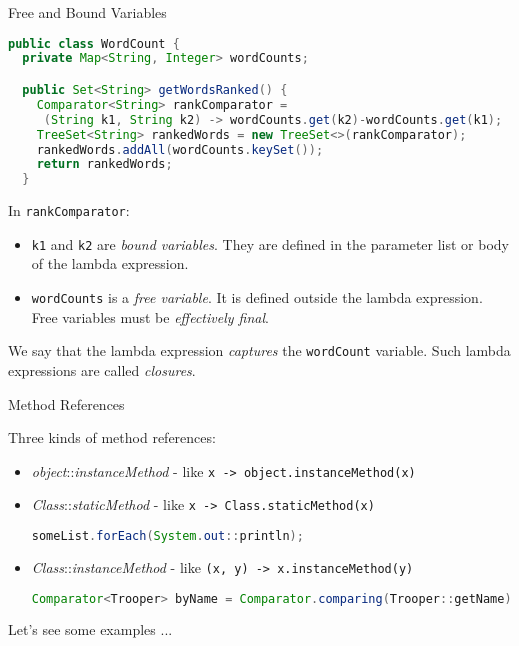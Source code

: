 \documentclass{beamer}
\begin{document}
\begin{frame}[fragile]{Free and Bound Variables}

\begin{lstlisting}[language=Java]
public class WordCount {
  private Map<String, Integer> wordCounts;

  public Set<String> getWordsRanked() {
    Comparator<String> rankComparator =
     (String k1, String k2) -> wordCounts.get(k2)-wordCounts.get(k1);
    TreeSet<String> rankedWords = new TreeSet<>(rankComparator);
    rankedWords.addAll(wordCounts.keySet());
    return rankedWords;
  }
\end{lstlisting}

In {\tt rankComparator}:

\begin{itemize}
\item {\tt k1} and {\tt k2} are {\it bound variables}.  They are defined in the parameter list or body of the lambda expression.
\item {\tt wordCounts} is a {\it free variable}.  It is defined outside the lambda expression. Free variables must be {\it effectively final}.
\end{itemize}

We say that the lambda expression {\it captures} the {\tt wordCount} variable.  Such lambda expressions are called {\it closures}.

\end{frame}


\begin{frame}[fragile]{Method References}

Three kinds of method references:
\begin{itemize}
\item {\it object}::{\it instanceMethod} - like {\tt x -> object.instanceMethod(x)}

\item {\it Class}::{\it staticMethod} - like {\tt x -> Class.staticMethod(x)}
\begin{lstlisting}[language=Java]
someList.forEach(System.out::println);
\end{lstlisting}

\item {\it Class}::{\it instanceMethod} - like {\tt (x, y) -> x.instanceMethod(y)}
\begin{lstlisting}[language=Java]
Comparator<Trooper> byName = Comparator.comparing(Trooper::getName);
\end{lstlisting}

\end{itemize}

Let's see some examples ...

\end{frame}
\end{document}
